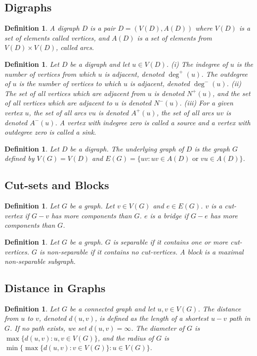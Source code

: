\documentclass[11pt]{article}
\newtheorem{definition}[theorem]{Definition}
\begin{document}
\subsection{Digraphs}
\begin{definition}
A digraph $D$ is a pair $D=(V(D),A(D))$ where $V(D)$ is a set of elements called vertices, and $A(D)$ is a set of elements from $V(D)\times V(D)$, called arcs.
\end{definition}
\begin{definition}
Let $D$ be a digraph and let $u\in V(D)$. 
(i) The indegree of $u$ is the number of vertices from which $u$ is adjacent, denoted $\deg^+(u)$. The outdegree of $u$ is the number of vertices to which $u$ is adjacent, denoted $\deg^-(u)$. 
(ii) The set of all vertices which are adjacent from $u$ is denoted $N^+(u)$, and the set of all vertices which are adjacent to $u$ is denoted $N^-(u)$. 
(iii) For a given vertex $u$, the set of all arcs $vu$ is denoted $A^+(u)$, the set of all arcs $uv$ is denoted $A^-(u)$. 
A vertex with indegree zero is called a source and a vertex with outdegree zero is called a sink.
\end{definition}
\begin{definition}
Let $D$ be a digraph. The underlying graph of $D$ is the graph $G$ defined by 
$V(G)=V(D)$ and 
$E(G)=\{uv: uv\in A(D)\text{ or }vu\in A(D)\}$.
\end{definition}
\subsection{Cut-sets and Blocks}
\begin{definition}
Let $G$ be a graph. Let $v\in V(G)$ and $e\in E(G)$. $v$ is a cut-vertex if $G-v$ has more components than $G$. $e$ is a bridge if $G-e$ has more components than $G$.
\end{definition}
\begin{definition}
Let $G$ be a graph. $G$ is separable if it contains one or more cut-vertices. $G$ is non-separable if it contains no cut-vertices. A block is a maximal non-separable subgraph.
\end{definition}
\subsection{Distance in Graphs}
\begin{definition}
Let $G$ be a connected graph and let $u,v\in V(G)$. The distance from $u$ to $v$, denoted $d(u,v)$, is defined as the length of a shortest $u\!-\!v$ path in $G$. If no path exists, we set $d(u,v)=\infty$. The diameter of $G$ is $\max\{d(u,v):u,v\in V(G)\}$, and the radius of $G$ is $\min\{\max\{d(u,v):v\in V(G)\}:u\in V(G)\}$.
\end{definition}
\end{document}
